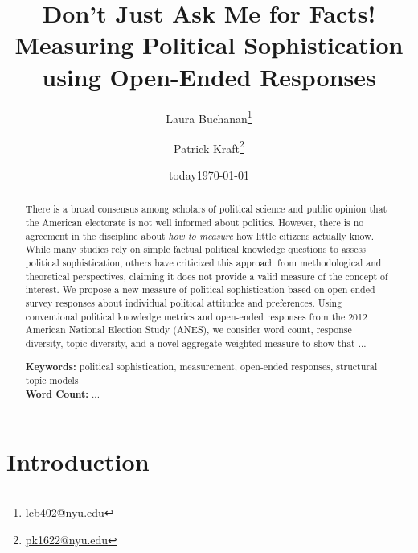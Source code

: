 \documentclass[12pt]{article}
\author{Laura Buchanan\footnote{\href{mailto:lcb402@nyu.edu}{lcb402@nyu.edu}} \and Patrick Kraft\footnote{\href{mailto:pk1622@nyu.edu}{pk1622@nyu.edu}}}
\date{today}
\title{Don't Just Ask Me for Facts!\\
\large{Measuring Political Sophistication using Open-Ended Responses}}
\date{\today}
\begin{document}
\maketitle\doublespacing\thispagestyle{empty}

\begin{abstract}
There is a broad consensus among scholars of political science and public opinion that the American electorate is not well informed about politics. However, there is no agreement in the discipline about \textit{how to measure} how little citizens actually know. While many studies rely on simple factual political knowledge questions to assess political sophistication, others have criticized this approach from methodological and theoretical perspectives, claiming it does not provide a valid measure of the concept of interest. We propose a new measure of political sophistication based on open-ended survey responses about individual political attitudes and preferences. Using conventional political knowledge metrics and open-ended responses from the 2012 American National Election Study (ANES), we consider word count, response diversity, topic diversity, and a novel aggregate weighted measure to show that ...

\vspace{\baselineskip}
\noindent \textbf{Keywords:} political sophistication, measurement, open-ended responses, structural topic models \\

\noindent \textbf{Word Count:} ...
\end{abstract}
\newpage\setcounter{page}{1}



\section{Introduction}
\end{document}
